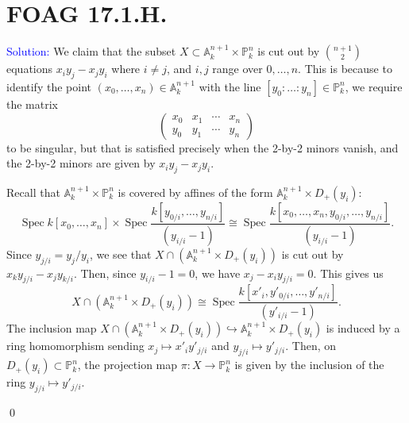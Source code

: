 \documentclass[11pt]{article}
\renewcommand{\AA}{\mathbb{A}}
\newcommand{\PP}{\mathbb{P}}
\DeclareMathOperator{\Spec}{\operatorname{Spec}}
\newenvironment{solution}{\begin{trivlist}\item[]{\textcolor{blue}{Solution:}}}{\qed \end{trivlist}}
\begin{document}
\section*{FOAG 17.1.H.}

\begin{solution}
	We claim that the subset $X \subset \AA_k^{n+1} \times \PP_k^n$ is cut out by $\binom{n+1}{2}$ equations $x_iy_j - x_jy_i$ where $i \neq j$, and $i,j$ range over $0, \ldots, n$. This is because to identify the point $(x_0, \ldots, x_n) \in \AA_k^{n+1}$ with the line $[y_0: \ldots: y_n] \in \PP_k^n$, we require the matrix 
	\begin{equation*}
		\begin{pmatrix}
			x_0 & x_1 & \cdots & x_n \\
			y_0 & y_1 & \cdots & y_n
		\end{pmatrix}
	\end{equation*}
	to be singular, but that is satisfied precisely when the 2-by-2 minors vanish, and the 2-by-2 minors are given by $x_iy_j - x_jy_i$. 
	
	Recall that $\AA_{k}^{n+1} \times \PP_k^n$ is covered by affines of the form $\AA_k^{n+1} \times D_+(y_i)$: 
	\begin{equation*}
		\Spec k[x_0, \ldots, x_n] \times \Spec \frac{k[y_{0/i}, \ldots, y_{n/i}]}{(y_{i/i} - 1)}
		\cong \Spec \frac{k[x_0, \ldots, x_n, y_{0/i}, \ldots, y_{n/i}]}{(y_{i/i} - 1)} . 
	\end{equation*}
	Since $y_{j/i} = y_j / y_i$, we see that $X \cap (\AA_k^{n+1} \times D_+(y_i))$ is cut out by $x_k y_{j/i} - x_j y_{k/i}$. Then, since $y_{i/i} - 1 = 0$, we have $x_j - x_i y_{j/i} = 0$. This gives us 
	\begin{equation*}
		X \cap (\AA_k^{n+1} \times D_+(y_i)) 
		\cong 
		\Spec \frac{k[x'_i, y'_{0/i}, \ldots, y'_{n/i}]}{(y'_{i/i} - 1)}.
	\end{equation*}
	The inclusion map $X \cap (\AA_k^{n+1} \times D_+(y_i)) \hookrightarrow \AA_k^{n+1} \times D_+(y_i)$ is induced by a ring homomorphism sending $x_j \mapsto x'_i y'_{j/i}$ and $y_{j/i} \mapsto y'_{j/i}$. 
	Then, on $D_+(y_i) \subset \PP_k^n$, the projection map $\pi: X \rightarrow \PP_k^n$ is given by the inclusion of the ring $y_{j/i} \mapsto y'_{j/i}$. 


\end{solution}
\end{document}
